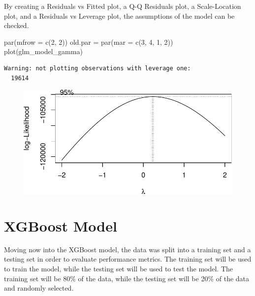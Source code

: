 \documentclass[
  super,
  preprint,
  3p]{elsarticle}
\newenvironment{Shaded}{\begin{snugshade}}{\end{snugshade}}
\newcommand{\AttributeTok}[1]{\textcolor[rgb]{0.40,0.45,0.13}{#1}}
\newcommand{\DecValTok}[1]{\textcolor[rgb]{0.68,0.00,0.00}{#1}}
\newcommand{\FunctionTok}[1]{\textcolor[rgb]{0.28,0.35,0.67}{#1}}
\newcommand{\NormalTok}[1]{\textcolor[rgb]{0.00,0.23,0.31}{#1}}
\newcommand{\OtherTok}[1]{\textcolor[rgb]{0.00,0.23,0.31}{#1}}
\begin{document}
By creating a Residuals vs Fitted plot, a Q-Q Residuals plot, a
Scale-Location plot, and a Residuals vs Leverage plot, the assumptions
of the model can be checked.

\begin{Shaded}
\begin{Highlighting}[]
\FunctionTok{par}\NormalTok{(}\AttributeTok{mfrow =} \FunctionTok{c}\NormalTok{(}\DecValTok{2}\NormalTok{, }\DecValTok{2}\NormalTok{))}
\NormalTok{old.par }\OtherTok{=} \FunctionTok{par}\NormalTok{(}\AttributeTok{mar =} \FunctionTok{c}\NormalTok{(}\DecValTok{3}\NormalTok{, }\DecValTok{4}\NormalTok{, }\DecValTok{1}\NormalTok{, }\DecValTok{2}\NormalTok{))}
\FunctionTok{plot}\NormalTok{(glm\_model\_gamma)}
\end{Highlighting}
\end{Shaded}

\begin{verbatim}
Warning: not plotting observations with leverage one:
  19614
\end{verbatim}

\begin{figure}[H]

{\centering \includegraphics{project_report_files/figure-pdf/unnamed-chunk-11-1.pdf}

}

\end{figure}

\hypertarget{xgboost-model}{%
\section{XGBoost Model}\label{xgboost-model}}

Moving now into the XGBoost model, the data was split into a training
set and a testing set in order to evaluate performance metrics. The
training set will be used to train the model, while the testing set will
be used to test the model. The training set will be 80\% of the data,
while the testing set will be 20\% of the data and randomly selected.
\end{document}
